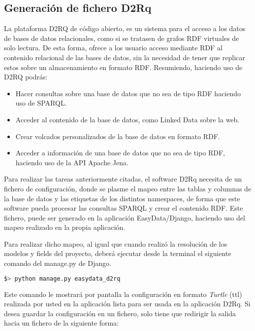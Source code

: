 \subsection{Generación de fichero D2Rq}

La plataforma D2RQ de código abierto, es un sistema para el acceso a los datos
de bases de datos relacionales, como si se tratasen de grafos RDF virtuales de
solo lectura. De esta forma, ofrece a los usuario acceso mediante RDF al
contenido relacional de las bases de datos, sin la necesidad de tener que
replicar estos sobre un almacenamiento en formato RDF. Resumiendo, haciendo uso
de D2RQ podrás:
\begin{itemize}
    \item Hacer consultas sobre una base de datos que no sea de tipo RDF
        haciendo uso de SPARQL.
    \item Acceder al contenido de la base de datos, como Linked Data sobre la
        web.
    \item Crear volcados personalizados de la base de datos en formato RDF.
    \item Acceder a información de una base de datos que no sea de tipo RDF,
        haciendo uso de la API Apache Jena.
\end{itemize}

Para realizar las tareas anteriormente citadas, el software D2Rq necesita de un
fichero de configuración, donde se plasme el mapeo entre las tablas y columnas
de la base de datos y las etiquetas de los distintos namespaces, de forma que
este software pueda procesar las consultas SPARQL y crear el contenido RDF. Este
fichero, puede ser generado en la aplicación EasyData/Django, haciendo uso del
mapeo realizado en la propia aplicación.

Para realizar dicho mapeo, al igual que cuando realizó la resolución de los
modelos y fields del proyecto, deberá ejecutar desde la terminal el siguiente
comando del manage.py de Django.

\begin{lstlisting}[frame=L, language=bash, basicstyle=\footnotesize]
$> python manage.py easydata_d2rq
\end{lstlisting}

Este comando le mostrará por pantalla la configuración en formato
\textit{Turtle} (ttl) realizada por usted en la aplicación lista para ser usada
en la aplicación D2Rq. Si desea guardar la configuración en un fichero, solo
tiene que redirigir la salida hacia un fichero de la siguiente forma:


